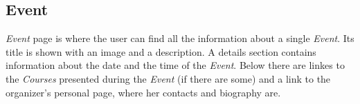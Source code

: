 \documentclass[../../DD.tex]{subfiles}
\begin{document}
	\newpage
	\subsection{Event}
		\textit{Event} page is where the user can find all the information about a single \textit{Event}. Its title is shown with an image and a description. A details section contains information about the date and the time of the \textit{Event}. Below there are linkes to the \textit{Courses} presented during the \textit{Event} (if there are some) and a link to the organizer's personal page, where her contacts and biography are.
		\newline
\end{document}
